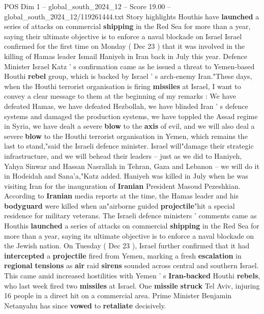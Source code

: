 \begin{textsample}{POS Dim 1 – global\_south\_2024\_12 – Score 19.00 – global\_south\_2024\_12/119261444.txt}  \label{ex:f1_pos_198}
Story highlights Houthis have \textbf{launched} a series of attacks on commercial \textbf{shipping} in the Red Sea for more than a year, saying their ultimate objective is to enforce a naval blockade on Israel Israel confirmed for the first time on Monday ( Dec 23 ) that it was involved in the killing of Hamas leader Ismail Haniyeh in Iran back in July this year.
Defence Minister Israel Katz ' s confirmation came as he issued a threat to Yemen-based Houthi \textbf{rebel} group, which is backed by Israel ' s arch-enemy Iran."These days, when the Houthi terrorist organisation is firing \textbf{missiles} at Israel, I want to convey a clear message to them at the beginning of my remarks : We have defeated Hamas, we have defeated Hezbollah, we have blinded Iran ' s defence systems and damaged the production systems, we have toppled the Assad regime in Syria, we have dealt a severe \textbf{blow} to the \textbf{axis} of evil, and we will also deal a severe \textbf{blow} to the Houthi terrorist organisation in Yemen, which remains the last to stand,"said the Israeli defence minister.
Israel will"damage their strategic infrastructure, and we will behead their leaders -- just as we did to Haniyeh, Yahya Sinwar and Hassan Nasrallah in Tehran, Gaza and Lebanon -- we will do it in Hodeidah and Sana'a,"Katz added.
Haniyeh was killed in July when he was visiting Iran for the inauguration of \textbf{Iranian} President Masoud Pezeshkian.
According to \textbf{Iranian} media reports at the time, the Hamas leader and his \textbf{bodyguard} were killed when an"airborne guided \textbf{projectile}"hit a special residence for military veterans.
The Israeli defence ministers ' comments came as Houthis \textbf{launched} a series of attacks on commercial \textbf{shipping} in the Red Sea for more than a year, saying its ultimate objective is to enforce a naval blockade on the Jewish nation.
On Tuesday ( Dec 23 ), Israel further confirmed that it had \textbf{intercepted} a \textbf{projectile} fired from Yemen, marking a fresh \textbf{escalation} in \textbf{regional} \textbf{tensions} as \textbf{air} raid \textbf{sirens} sounded across central and southern Israel.
This came amid increased hostilities with Yemen ' s \textbf{Iran-backed} Houthi \textbf{rebels}, who last week fired two \textbf{missiles} at Israel.
One \textbf{missile} \textbf{struck} Tel Aviv, injuring 16 people in a direct hit on a commercial area.
Prime Minister Benjamin Netanyahu has since \textbf{vowed} to \textbf{retaliate} decisively.

\end{textsample}
